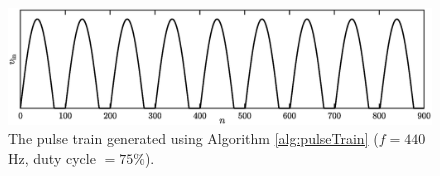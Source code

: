 \begin{figure}[t]
    \centering
    \includegraphics[width=\textwidth]{figures/exciters/physInsp/pulseTrain.eps}
    \caption{The pulse train generated using Algorithm \ref{alg:pulseTrain} ($f = 440$ Hz, duty cycle $ = 75\%$).
    \label{fig:pulseTrain}}
\end{figure}